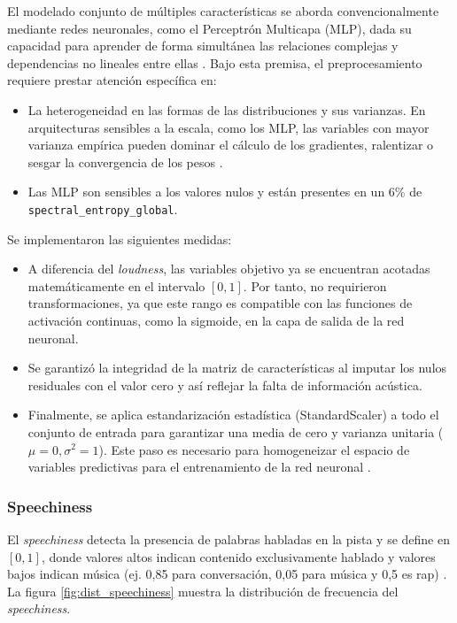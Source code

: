 El modelado conjunto de múltiples características se aborda convencionalmente mediante redes neuronales, como el Perceptrón Multicapa (MLP), dada su capacidad para aprender de forma simultánea las relaciones complejas y dependencias no lineales entre ellas \citep{goodfellow2016deep}. Bajo esta premisa, el preprocesamiento requiere prestar atención específica en:

\begin{itemize}
    \item La heterogeneidad en las formas de las distribuciones y sus varianzas. En arquitecturas sensibles a la escala, como los MLP, las variables con mayor varianza empírica pueden dominar el cálculo de los gradientes, ralentizar o sesgar la convergencia de los pesos \citep{goodfellow2016deep}.
    \item Las MLP son sensibles a los valores nulos y están presentes en un 6\% de \texttt{spectral\_entropy\_global}.
\end{itemize}

Se implementaron las siguientes medidas:
\begin{itemize}
    \item A diferencia del \textit{loudness}, las variables objetivo ya se encuentran acotadas matemáticamente en el intervalo $[0, 1]$. Por tanto, no requirieron transformaciones, ya que este rango es compatible con las funciones de activación continuas, como la sigmoide, en la capa de salida de la red neuronal.
    \item Se garantizó la integridad de la matriz de características al imputar los nulos residuales con el valor cero y así reflejar la falta de información acústica.
    \item Finalmente, se aplica estandarización estadística (StandardScaler) a todo el conjunto de entrada para garantizar una media de cero y varianza unitaria ($\mu=0, \sigma^2=1$). Este paso es necesario para homogeneizar el espacio de variables predictivas para el entrenamiento de la red neuronal \citep{goodfellow2016deep}.
\end{itemize}

\subsubsection{Speechiness}
El \textit{speechiness} detecta la presencia de palabras habladas en la pista y se define en $[0, 1]$, donde valores altos indican contenido exclusivamente hablado y valores bajos indican música (ej. 0,85 para conversación, 0,05 para música y 0,5 es rap) \citep{spotify}.
La figura \ref{fig:dist_speechiness} muestra la distribución de frecuencia del \textit{speechiness}. 

